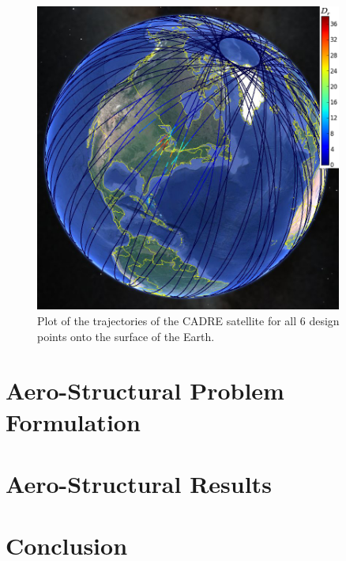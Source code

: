 \documentclass[]{aiaa-tc} %
\begin{document}
\begin{figure}
\centering
\includegraphics[width=0.9\textwidth]{images/allpts_gearth2.png}
\caption[width=0.4\textwidth]{Plot of the trajectories of the CADRE satellite
for all 6 design points onto the surface of the Earth.}
\label{pt3_g_earth}
\end{figure}


  \section{Aero-Structural Problem Formulation}

  \section{Aero-Structural Results}

  \section{Conclusion}

  
\end{document}
